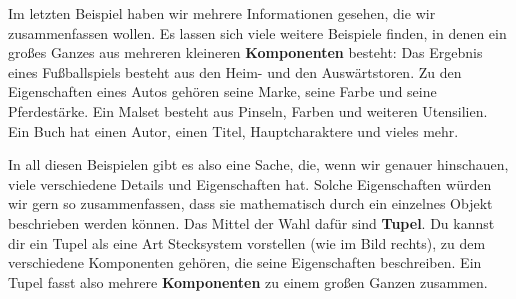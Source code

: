 \documentclass[../../main.tex]{subfiles}
\begin{document}

Im letzten Beispiel haben wir mehrere Informationen gesehen, die wir zusammenfassen wollen. Es lassen sich viele weitere Beispiele finden, in denen ein großes Ganzes aus mehreren kleineren \textbf{Komponenten} besteht: Das Ergebnis eines Fußballspiels besteht aus den Heim- und den Auswärtstoren. Zu den Eigenschaften eines Autos gehören seine Marke, seine Farbe und seine Pferdestärke. Ein Malset besteht aus Pinseln, Farben und weiteren Utensilien. Ein Buch hat einen Autor, einen Titel, Hauptcharaktere und vieles mehr.


In all diesen Beispielen gibt es also eine Sache, die, wenn wir genauer hinschauen, viele verschiedene Details und Eigenschaften hat. Solche Eigenschaften würden wir gern so zusammenfassen, dass sie mathematisch durch ein einzelnes Objekt beschrieben werden können. Das Mittel der Wahl dafür sind \textbf{Tupel}. Du kannst dir ein Tupel als eine Art Stecksystem vorstellen (wie im Bild rechts), zu dem verschiedene Komponenten gehören, die seine Eigenschaften beschreiben. Ein Tupel fasst also mehrere \textbf{Komponenten} zu einem großen Ganzen zusammen.
\end{document}
